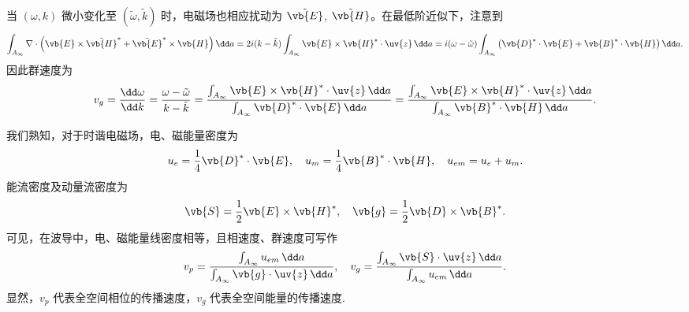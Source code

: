 当 \((\omega, k)\) 微小变化至 \((\tilde{\omega}, \tilde{k})\) 时，电磁场也相应扰动为 \(\tilde{\vb{E}}\), \(\tilde{\vb{H}}\)。在最低阶近似下，注意到
\begin{align*}
	\int_{A_\infty} \nabla \cdot \left( \vb{E} \times \tilde{\vb{H}}^* + \tilde{\vb{E}}^* \times \vb{H} \right) \dd a = 2i(k - \tilde{k}) \int_{A_\infty} \vb{E} \times \vb{H}^* \cdot \uv{z} \, \dd a = i(\omega - \tilde{\omega}) \int_{A_\infty} \left( \vb{D}^* \cdot \vb{E} + \vb{B}^* \cdot \vb{H} \right) \dd a.
\end{align*}
因此群速度为
\begin{align*}
	v_g = \dfrac{\dd \omega}{\dd k} = \dfrac{\omega - \tilde{\omega}}{k - \tilde{k}} = \dfrac{\int_{A_\infty} \vb{E} \times \vb{H}^* \cdot \uv{z} \, \dd a}{\int_{A_\infty} \vb{D}^* \cdot \vb{E} \, \dd a} = \dfrac{\int_{A_\infty} \vb{E} \times \vb{H}^* \cdot \uv{z} \, \dd a}{\int_{A_\infty} \vb{B}^* \cdot \vb{H} \, \dd a}.
\end{align*}

我们熟知，对于时谐电磁场，电、磁能量密度为
\begin{align*}
	u_e = \dfrac{1}{4} \vb{D}^* \cdot \vb{E}, \quad u_m = \dfrac{1}{4} \vb{B}^* \cdot \vb{H}, \quad u_{em} = u_e + u_m.
\end{align*}
能流密度及动量流密度为
\begin{align*}
	\vb{S} = \dfrac{1}{2} \vb{E} \times \vb{H}^*, \quad \vb{g} = \dfrac{1}{2} \vb{D} \times \vb{B}^*.
\end{align*}
可见，在波导中，电、磁能量线密度相等，且相速度、群速度可写作
\begin{align*}
	v_p = \dfrac{\int_{A_\infty} u_{em} \, \dd a}{\int_{A_\infty} \vb{g} \cdot \uv{z} \, \dd a}, \quad v_g = \dfrac{\int_{A_\infty} \vb{S} \cdot \uv{z} \, \dd a}{\int_{A_\infty} u_{em} \, \dd a}.
\end{align*}
显然，\(v_p\) 代表全空间相位的传播速度，\(v_g\) 代表全空间能量的传播速度.

